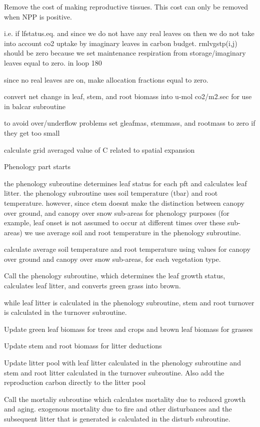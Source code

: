 Remove the cost of making reproductive tissues. This cost can only be removed when N\+P\+P is positive.

i.\+e. if lfstatus.\+eq. and since we do not have any real leaves on then we do not take into account co2 uptake by imaginary leaves in carbon budget. rmlvgstp(i,j) should be zero because we set maintenance respiration from storage/imaginary leaves equal to zero. in loop 180

since no real leaves are on, make allocation fractions equal to zero.

convert net change in leaf, stem, and root biomass into u-\/mol co2/m2.\+sec for use in balcar subroutine

to avoid over/underflow problems set gleafmas, stemmass, and rootmass to zero if they get too small

calculate grid averaged value of C related to spatial expansion

Phenology part starts

the phenology subroutine determines leaf status for each pft and calculates leaf litter. the phenology subroutine uses soil temperature (tbar) and root temperature. however, since ctem doesn\textquotesingle{}t make the distinction between canopy over ground, and canopy over snow sub-\/areas for phenology purposes (for example, leaf onset is not assumed to occur at different times over these sub-\/areas) we use average soil and root temperature in the phenology subroutine.

calculate average soil temperature and root temperature using values for canopy over ground and canopy over snow sub-\/areas, for each vegetation type.

Call the phenology subroutine, which determines the leaf growth status, calculates leaf litter, and converts green grass into brown.

while leaf litter is calculated in the phenology subroutine, stem and root turnover is calculated in the turnover subroutine.

Update green leaf biomass for trees and crops and brown leaf biomass for grasses

Update stem and root biomass for litter deductions

Update litter pool with leaf litter calculated in the phenology subroutine and stem and root litter calculated in the turnover subroutine. Also add the reproduction carbon directly to the litter pool

Call the mortaliy subroutine which calculates mortality due to reduced growth and aging. exogenous mortality due to fire and other disturbances and the subsequent litter that is generated is calculated in the disturb subroutine.

